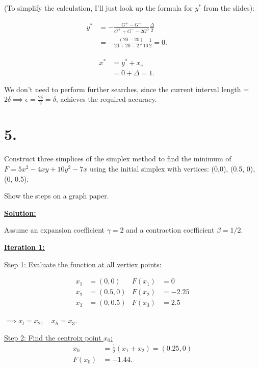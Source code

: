 \documentclass{article}
\begin{document}
(To simplify the calculation, I'll just look up the formula for $y^*$ from the slides):

\begin{align*}
  y^* 
  &= - \frac{G^+ - G^-}{G^+ + G^- -2G^0} \frac{\Delta}{2} &&\\
  &= - \frac{(20 - 20)}{20 + 20 -2*10} \frac{1}{2} = 0.
\end{align*}

\begin{align*}
  x^*
  &= y^* + x_c &&\\
  &= 0 + \Delta = 1.
\end{align*}

We don't need to perform further searches, since the current interval length = $2\delta \implies \epsilon = \frac{2\delta}{2} = \delta$, achieves the required accuracy. 

\newpage

\section*{5.}
Construct three simplices of the simplex method to find the minimum of
$F = 5x^2 - 4xy + 10y^2 - 7x$ using the initial simplex with vertices: (0,0), (0.5, 0), (0, 0.5).

\noindent
Show the steps on a graph paper.

\begin{center}
  \textbf{\underline{Solution:}}  
\end{center}

Assume an expansion coefficient $\gamma = 2$ and a contraction coefficient $\beta = 1/2$.
\newline

\textbf{\underline{Iteration 1:}}
\newline

\qquad
\underline{Step 1: Evaluate the function at all vertiex points:}

\begin{align*}
  x_1 &= (0,0)   &F(x_1) &= 0 \\
  x_2 &= (0.5,0) &F(x_2) &= -2.25 \\
  x_3 &= (0,0.5) &F(x_3) &= 2.5
\end{align*}

\qquad
$\implies x_l = x_2, \quad x_h = x_3.$
\newline

\qquad
\underline{Step 2: Find the centroix point $x_0$:}
\begin{align*}
  x_0    &= \frac{1}{2} (x_1 + x_2) = (0.25, 0) \\
  F(x_0) &= -1.44.
\end{align*}
\newline
\end{document}
